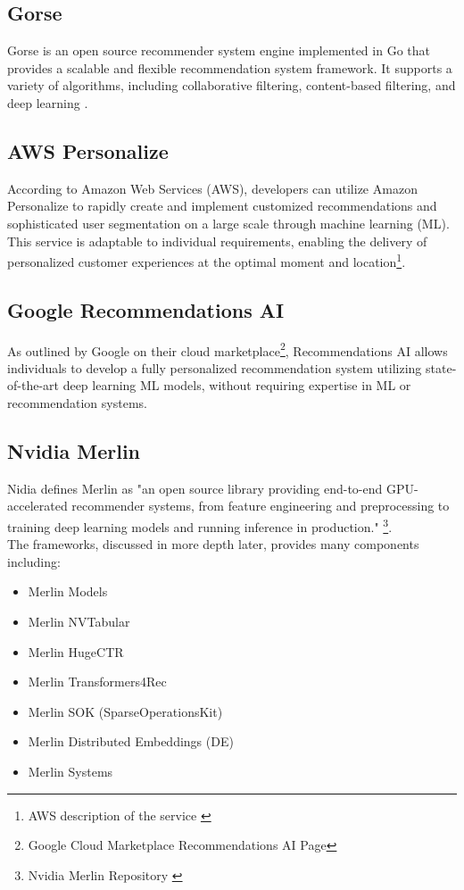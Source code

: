 \subsection{Gorse}
Gorse\cite{Gorse} is an open source recommender system engine implemented in Go that provides a scalable and flexible recommendation system framework. It supports a variety of algorithms, including collaborative filtering, content-based filtering, and deep learning \cite{Rexy}.

\subsection{AWS Personalize}
According to Amazon Web Services (AWS), developers can utilize Amazon Personalize \cite{AWSPersonalize} to rapidly create and implement customized recommendations and sophisticated user segmentation on a large scale through machine learning (ML). This service is adaptable to individual requirements, enabling the delivery of personalized customer experiences at the optimal moment and location\footnote{AWS description of the service \cite{AWSPersonalize} }. \\

\subsection{Google Recommendations AI}
As outlined by Google on their cloud marketplace\footnote{Google Cloud Marketplace Recommendations AI Page\cite{GoogleMarketplaceRecAi}}, Recommendations AI \cite{GoogleRecommendationsAI} allows individuals to develop a fully personalized recommendation system utilizing state-of-the-art deep learning ML models, without requiring expertise in ML or recommendation systems. \\

\subsection{Nvidia Merlin}

Nidia defines Merlin \cite{NvidiaMerlin} as "an open source library providing end-to-end GPU-accelerated recommender systems, from feature engineering and preprocessing to training deep learning models and running inference in production." \footnote{Nvidia Merlin Repository \cite{NvidiaMerlinRepo}}. \\

The frameworks, discussed in more depth later, provides many components including:
\begin{itemize}
    \item Merlin Models \cite{MerlinModels}
    \item Merlin NVTabular \cite{MerlinNVTabular}
    \item Merlin HugeCTR \cite{MerlinHugeCTR}
    \item Merlin Transformers4Rec \cite{MerlinTransformer4Rec}
    \item Merlin SOK (SparseOperationsKit)
    \item Merlin Distributed Embeddings (DE)
    \item Merlin Systems \cite{MerlinSystemsRepo}
\end{itemize}

